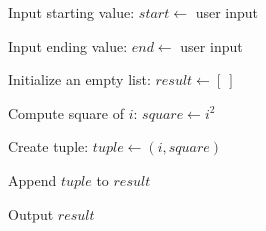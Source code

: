 \begin{algorithm}
\caption{Create Tuples Containing Numbers and Their Squares}
\begin{algorithmic}[1]

\STATE Input starting value:
\STATE $start \gets$ user input

\STATE Input ending value:
\STATE $end \gets$ user input

\STATE Initialize an empty list:
\STATE $result \gets [\ ]$

    \STATE Compute square of $i$:
    \STATE $square \gets i^2$
    
    \STATE Create tuple:
    \STATE $tuple \gets (i, square)$
    
    \STATE Append $tuple$ to $result$
\ENDFOR

\STATE Output $result$

\end{algorithmic}
\end{algorithm}